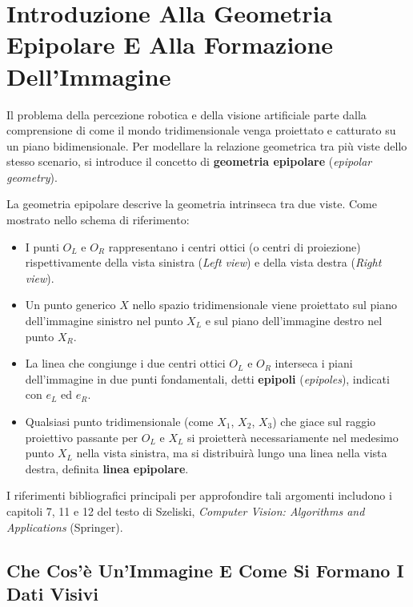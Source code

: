 ﻿\documentclass[11pt, a4paper]{article}
\author{Francesco Lo Verde}
\begin{document}
\section{Introduzione Alla Geometria Epipolare E Alla Formazione Dell'Immagine}

Il problema della percezione robotica e della visione artificiale parte dalla comprensione di come il mondo tridimensionale venga proiettato e catturato su un piano bidimensionale. Per modellare la relazione geometrica tra più viste dello stesso scenario, si introduce il concetto di \textbf{geometria epipolare} (\emph{epipolar geometry}).


La geometria epipolare descrive la geometria intrinseca tra due viste. Come mostrato nello schema di riferimento:
\begin{itemize}[noitemsep]
    \item I punti $O_L$ e $O_R$ rappresentano i centri ottici (o centri di proiezione) rispettivamente della vista sinistra (\emph{Left view}) e della vista destra (\emph{Right view}).
    \item Un punto generico $X$ nello spazio tridimensionale viene proiettato sul piano dell'immagine sinistro nel punto $X_L$ e sul piano dell'immagine destro nel punto $X_R$.
    \item La linea che congiunge i due centri ottici $O_L$ e $O_R$ interseca i piani dell'immagine in due punti fondamentali, detti \textbf{epipoli} (\emph{epipoles}), indicati con $e_L$ ed $e_R$.
    \item Qualsiasi punto tridimensionale (come $X_1$, $X_2$, $X_3$) che giace sul raggio proiettivo passante per $O_L$ e $X_L$ si proietterà necessariamente nel medesimo punto $X_L$ nella vista sinistra, ma si distribuirà lungo una linea nella vista destra, definita \textbf{linea epipolare}.
\end{itemize}

I riferimenti bibliografici principali per approfondire tali argomenti includono i capitoli 7, 11 e 12 del testo di Szeliski, \emph{Computer Vision: Algorithms and Applications} (Springer).

\newpage

\subsection{Che Cos'è Un'Immagine E Come Si Formano I Dati Visivi}
\end{document}
